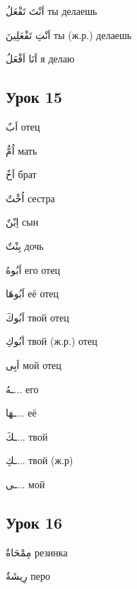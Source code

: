 \documentclass[a5paper]{article}
\newcommand\textstyleDropCaps[1]{#1}
\newcommand\textstyleCaptioncharacters[1]{#1}
\begin{document}
\textstyleCaptioncharacters{اَنْتَ تَفْعَلُ }\textstyleDropCaps{ты делаешь‎}

\textstyleCaptioncharacters{اَنْتِ تَفْعَلِينَ }\textstyleDropCaps{ты (ж.р.) де­лаешь‎}

\textstyleCaptioncharacters{اَنَا اَفْعَلُ }\textstyleDropCaps{я делаю‎}

\subsection[Урок 15‎]{\textstyleDropCaps{Урок 15‎}}
\textstyleCaptioncharacters{اَبٌ }\textstyleDropCaps{отец‎}

\textstyleCaptioncharacters{اُمٌّ }\textstyleDropCaps{мать‎}

\textstyleCaptioncharacters{اَخٌ }\textstyleDropCaps{брат‎}

\textstyleCaptioncharacters{اُخْتٌ }\textstyleDropCaps{сестра‎}

\textstyleCaptioncharacters{اِبْنٌ }\textstyleDropCaps{сын‎}

\textstyleCaptioncharacters{بِنْتٌ }\textstyleDropCaps{дочь‎}

\textstyleCaptioncharacters{اَبُوهُ }\textstyleDropCaps{его отец‎}

\textstyleCaptioncharacters{اَبُوهَا }\textstyleDropCaps{её отец‎}

\textstyleCaptioncharacters{اَبُوكَ }\textstyleDropCaps{твой отец‎}

\textstyleCaptioncharacters{اَبُوكِ }\textstyleDropCaps{твой (ж.р.) отец‎}

\textstyleCaptioncharacters{اَبِى }\textstyleDropCaps{мой отец‎}

\textstyleCaptioncharacters{ـهُ... }\textstyleDropCaps{его‎}

\textstyleCaptioncharacters{ـهَا... }\textstyleDropCaps{её‎}

\textstyleCaptioncharacters{ـكَ... }\textstyleDropCaps{твой‎}

\textstyleCaptioncharacters{ـكِ... }\textstyleDropCaps{твой (ж.р)‎}

\textstyleCaptioncharacters{ـى... }\textstyleDropCaps{мой‎}

\subsection[Урок 16‎]{\textstyleDropCaps{Урок 16‎}}
\textstyleCaptioncharacters{مِمْحَاةٌ }\textstyleDropCaps{резинка‎}

\textstyleCaptioncharacters{رِيشَةٌ }\textstyleDropCaps{перо‎}
\end{document}
